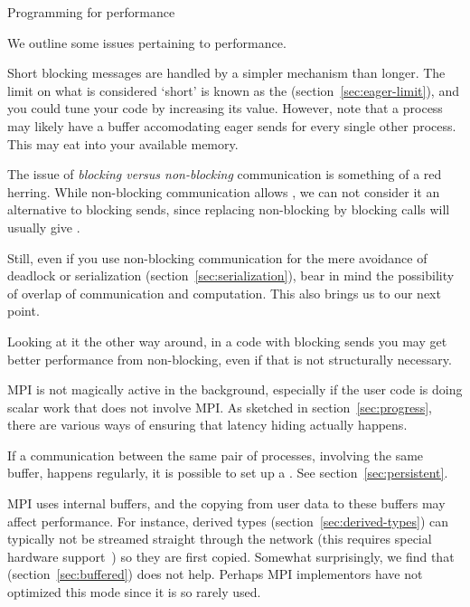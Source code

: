 

 {Programming for performance}

We outline some issues pertaining to performance.


Short blocking messages are handled by a simpler mechanism than
longer. The limit on what is considered `short' is known as the
 (section~\ref{sec:eager-limit}), and you could
tune your code by increasing its value. However, note that a process
may likely have a buffer accomodating eager sends for every single
other process. This may eat into your available memory.

%
The issue of \emph{blocking versus
  non-blocking}
communication is something of a red herring. While non-blocking
communication allows , we can not
consider it an alternative to blocking sends, since replacing
non-blocking by blocking calls will usually give .

Still, even if you use non-blocking communication for the mere
avoidance of deadlock or serialization
(section~\ref{sec:serialization}), bear in mind the possibility of
overlap of communication and computation. This also brings us to our
next point.

Looking at it the other way around, in a code with blocking sends you
may get better performance from non-blocking, even if that is not
structurally necessary.


MPI is not magically active in the background, especially if the user
code is doing scalar work that does not involve MPI. As sketched in
section~\ref{sec:progress}, there are various ways of ensuring that
latency hiding actually happens.


If a communication between the same pair of processes, involving the
same buffer, happens regularly, it is possible to set up a
. See section~\ref{sec:persistent}.


MPI uses internal buffers, and the copying from user data to these
buffers may affect performance. For instance, derived types
(section~\ref{sec:derived-types}) can typically not be streamed
straight through the network (this requires special hardware
support~\cite{LI:MpiDataUMR}) so they are first copied. Somewhat
surprisingly, we find that 
(section~\ref{sec:buffered}) does not help. Perhaps MPI implementors
have not optimized this mode since it is so rarely used.

